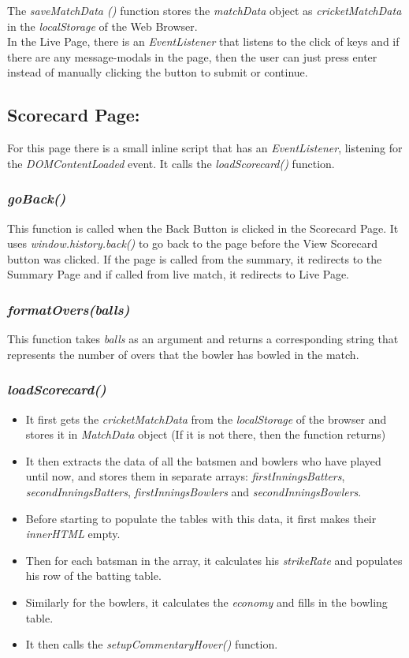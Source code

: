 \documentclass[a4paper,12pt]{article}
\begin{document}
\hspace{0.5cm}

The \textit {saveMatchData ()} function stores the \textit {matchData} object as \textit {cricketMatchData} in the \textit {localStorage} of the Web Browser. \\

In the Live Page, there is an \textit{EventListener} that listens to the click of keys and if there are any message-modals in the page, then the user can just press enter instead of manually clicking the button to submit or continue. 

\subsection{Scorecard Page:}
\label{basic3}
For this page there is a small inline script that has an \textit{EventListener}, listening for the \textit{DOMContentLoaded} event.
It calls the \textit{loadScorecard()} function.
\subsubsection{\textit{goBack()}}
This function is called when the Back Button is clicked in the Scorecard Page.
It uses \textit{window.history.back()} to go back to the page before the View Scorecard button was clicked.
If the page is called from the summary, it redirects to the Summary Page and if called from live match, it redirects to Live Page.

\subsubsection{\textit{formatOvers(balls)}}
This function takes \textit{balls} as an argument and returns a corresponding string that represents the number of overs that the bowler has bowled in the match.

\subsubsection{\textit{loadScorecard()}}
\begin{itemize}
\item It first gets the \textit{cricketMatchData} from the \textit{localStorage} of the browser and stores it in \textit{MatchData} object (If it is not there, then the function returns)
\item It then extracts the data of all the batsmen and bowlers who have played until now, and stores them in separate arrays: \textit{firstInningsBatters}, \textit{secondInningsBatters}, \textit{firstInningsBowlers} and \textit{secondInningsBowlers}.
\item Before starting to populate the tables with this data, it first makes their \textit{innerHTML} empty.
\item Then for each batsman in the array, it calculates his \textit{strikeRate} and populates his row of the batting table.
\item Similarly for the bowlers, it calculates the \textit{economy} and fills in the bowling table.
\item It then calls the \textit{setupCommentaryHover()} function. 
\end{itemize}
\end{document}
